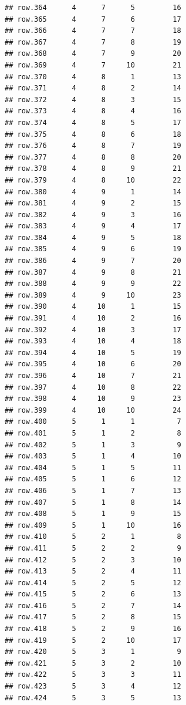 \documentclass[
]{article}
\begin{document}
\begin{verbatim}
## row.364      4      7      5         16
## row.365      4      7      6         17
## row.366      4      7      7         18
## row.367      4      7      8         19
## row.368      4      7      9         20
## row.369      4      7     10         21
## row.370      4      8      1         13
## row.371      4      8      2         14
## row.372      4      8      3         15
## row.373      4      8      4         16
## row.374      4      8      5         17
## row.375      4      8      6         18
## row.376      4      8      7         19
## row.377      4      8      8         20
## row.378      4      8      9         21
## row.379      4      8     10         22
## row.380      4      9      1         14
## row.381      4      9      2         15
## row.382      4      9      3         16
## row.383      4      9      4         17
## row.384      4      9      5         18
## row.385      4      9      6         19
## row.386      4      9      7         20
## row.387      4      9      8         21
## row.388      4      9      9         22
## row.389      4      9     10         23
## row.390      4     10      1         15
## row.391      4     10      2         16
## row.392      4     10      3         17
## row.393      4     10      4         18
## row.394      4     10      5         19
## row.395      4     10      6         20
## row.396      4     10      7         21
## row.397      4     10      8         22
## row.398      4     10      9         23
## row.399      4     10     10         24
## row.400      5      1      1          7
## row.401      5      1      2          8
## row.402      5      1      3          9
## row.403      5      1      4         10
## row.404      5      1      5         11
## row.405      5      1      6         12
## row.406      5      1      7         13
## row.407      5      1      8         14
## row.408      5      1      9         15
## row.409      5      1     10         16
## row.410      5      2      1          8
## row.411      5      2      2          9
## row.412      5      2      3         10
## row.413      5      2      4         11
## row.414      5      2      5         12
## row.415      5      2      6         13
## row.416      5      2      7         14
## row.417      5      2      8         15
## row.418      5      2      9         16
## row.419      5      2     10         17
## row.420      5      3      1          9
## row.421      5      3      2         10
## row.422      5      3      3         11
## row.423      5      3      4         12
## row.424      5      3      5         13

\end{verbatim}
\end{document}
